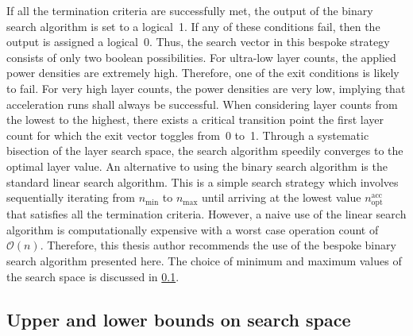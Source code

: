 If all the  termination criteria are successfully met, the  output of the binary
search algorithm is  set to a logical~1.  If any of these  conditions fail, then
the output  is assigned  a logical~0.  Thus, the search  vector in  this bespoke
strategy consists of only two boolean possibilities. For ultra-low layer counts,
the  applied power  densities are  extremely high.  Therefore, one  of the  exit
conditions is  likely to fail. For  very high layer counts,  the power densities
are very low,  implying that acceleration runs shall always  be successful. When
considering layer counts from the lowest to the highest, there exists a critical
transition point \viz{} the first layer  count for which the exit vector toggles
from~0  to~1.  Through  a  systematic  bisection  of  the  layer  search  space,
the  search  algorithm  speedily  converges  to  the  optimal  layer  value.  An
alternative to using  the binary search algorithm is the  standard linear search
algorithm.  This  is  a  simple  search  strategy  which  involves  sequentially
iterating from  $n_\text{min}$ to  $n_\text{max}$ until  arriving at  the lowest
value  $n_\text{opt}^\text{acc}$ that  satisfies all  the termination  criteria.
However, a naive use of the linear search algorithm is computationally expensive
with a  worst case operation  count of $\mathcal{O}(n)$. Therefore,  this thesis
author recommends the use of the bespoke binary search algorithm presented here.
The choice  of minimum and  maximum values of the  search space is  discussed in
\cref{sec:layersearchbounds}.

\subsection{Upper and lower bounds on search space}\label{sec:layersearchbounds}



